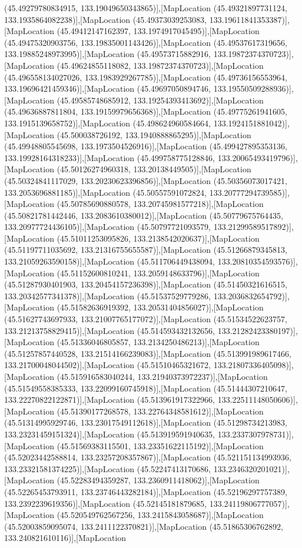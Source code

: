(45.49279780834915, 133.19049650343865)],[MapLocation (45.49321897731124, 133.1935864082238)],[MapLocation (45.49373039253083, 133.19611841353387)],[MapLocation (45.49412147162397, 133.1974917045495)],[MapLocation (45.49475320903756, 133.19835001143426)],[MapLocation (45.49537617319656, 133.19885248973995)],[MapLocation (45.49573715882916, 133.19872374370723)],[MapLocation (45.49624855118082, 133.19872374370723)],[MapLocation (45.496558134027026, 133.1983929267785)],[MapLocation (45.49736156553964, 133.19696421459346)],[MapLocation (45.49697050894746, 133.19550509288936)],[MapLocation (45.49585748685912, 133.19254393413692)],[MapLocation (45.49636887811804, 133.19159979656368)],[MapLocation (45.49775261941605, 133.1915139658752)],[MapLocation (45.498624960584664, 133.1924151881042)],[MapLocation (45.500038726192, 133.1940888865295)],[MapLocation (45.49948805545698, 133.1973504526916)],[MapLocation (45.499427895353136, 133.19928164318233)],[MapLocation (45.499758775128846, 133.20065493419796)],[MapLocation (45.50126274960318, 133.20138449505)],[MapLocation (45.50324841117029, 133.20230623396856)],[MapLocation (45.50356073017421, 133.2053696881185)],[MapLocation (45.50557591072824, 133.20777294739585)],[MapLocation (45.50785690880578, 133.20745981577218)],[MapLocation (45.50821781442446, 133.2083610380012)],[MapLocation (45.50779675764435, 133.20977724436105)],[MapLocation (45.50797721093579, 133.21299589517892)],[MapLocation (45.51011253095826, 133.2138542020637)],[MapLocation (45.51197711035692, 133.21316755655587)],[MapLocation (45.51266879345813, 133.21059263590158)],[MapLocation (45.511706449438094, 133.20810354593576)],[MapLocation (45.51152600810241, 133.2059148633796)],[MapLocation (45.51287930401903, 133.20454157236398)],[MapLocation (45.51450321616515, 133.20342577341378)],[MapLocation (45.51537529779286, 133.2036832654792)],[MapLocation (45.51582636919392, 133.20531404856027)],[MapLocation (45.51627743697933, 133.21007765177072)],[MapLocation (45.51534522623757, 133.21213758829415)],[MapLocation (45.514593432132656, 133.21282423380197)],[MapLocation (45.51336046805857, 133.2134250486213)],[MapLocation (45.51257857440528, 133.21514166239083)],[MapLocation (45.513991989617466, 133.21700048044502)],[MapLocation (45.51510465321672, 133.21807336405098)],[MapLocation (45.515916583040244, 133.21940373972237)],[MapLocation (45.51549558385333, 133.22099160745918)],[MapLocation (45.51444307210647, 133.22270822122871)],[MapLocation (45.513961917322966, 133.22511148050606)],[MapLocation (45.51390177268578, 133.22764348581612)],[MapLocation (45.51314995929746, 133.23017549112618)],[MapLocation (45.51298734213983, 133.23231459151324)],[MapLocation (45.513919591940635, 133.2337307978731)],[MapLocation (45.51569383115501, 133.23351622115192)],[MapLocation (45.52023442588814, 133.23257208357867)],[MapLocation (45.521151134993936, 133.23321581374225)],[MapLocation (45.52247413170686, 133.2346320201021)],[MapLocation (45.52283494359287, 133.2360911418062)],[MapLocation (45.52265453793911, 133.23746443282184)],[MapLocation (45.52196297757389, 133.2392239619356)],[MapLocation (45.52145181879685, 133.24119806777057)],[MapLocation (45.520549762567256, 133.2415843058687)],[MapLocation (45.52003859095074, 133.2411122370821)],[MapLocation (45.51865306762892, 133.240821610116)],[MapLocation 